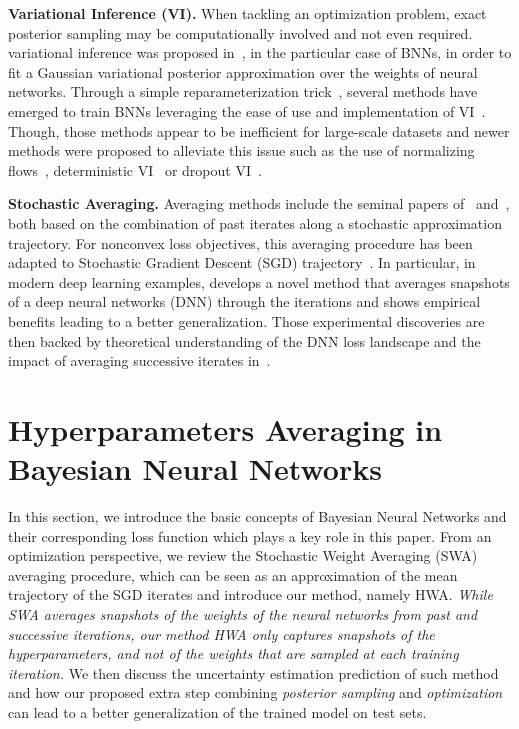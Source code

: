 \documentclass{article} %
\begin{document}
\textbf{Variational Inference (VI).}
When tackling an optimization problem, exact posterior sampling may be computationally involved and not even required.
variational inference was proposed in~\citep{graves2011practical}, in the particular case of BNNs, in order to fit a Gaussian variational posterior approximation over the weights of neural networks.
Through a simple reparameterization trick~\citep{blundell2015weight}, several methods have emerged to train BNNs leveraging the ease of use and implementation of VI~\citep{kingma2015variational,blundell2015weight,molchanov2017variational}.
Though, those methods appear to be inefficient for large-scale datasets and newer methods were proposed to alleviate this issue such as the use of normalizing flows~\citep{louizos2017multiplicative}, deterministic VI~\citep{wu2018deterministic} or dropout VI~\citep{gal2016dropout}.

\textbf{Stochastic Averaging.}
Averaging methods include the seminal papers of~\citep{polyak1990sa} and~\citep{ruppert1988efficient}, both based on the combination of past iterates along a stochastic approximation trajectory.
For nonconvex loss objectives, this averaging procedure has been adapted to Stochastic Gradient Descent (SGD) trajectory~\citep{zhou2017convergence}.
In particular, in modern deep learning examples, \citet{izmailov2018averaging} develops a novel method that averages snapshots of a deep neural networks (DNN) through the iterations and shows empirical benefits leading to a better generalization.
Those experimental discoveries are then backed by theoretical understanding of the DNN loss landscape and the impact of averaging successive iterates in~\citep{keskar2016large,he2019asymmetric}.


\section{Hyperparameters Averaging in Bayesian Neural Networks}\label{sec:main}

In this section, we introduce the basic concepts of Bayesian Neural Networks and their corresponding loss function which plays a key role in this paper.
From an optimization perspective, we review the Stochastic Weight Averaging (SWA)~\citep{izmailov2018averaging} averaging procedure, which can be seen as an approximation of the mean trajectory of the SGD iterates and introduce our method, namely HWA.
\textit{While SWA averages snapshots of the weights of the neural networks from past and successive iterations, our method HWA only captures snapshots of the hyperparameters, and not of the weights that are sampled at each training iteration.}
We then discuss the uncertainty estimation prediction of such method and how our proposed extra step combining \emph{posterior sampling} and \emph{optimization} can lead to a better generalization of the trained model on test sets.
\end{document}
